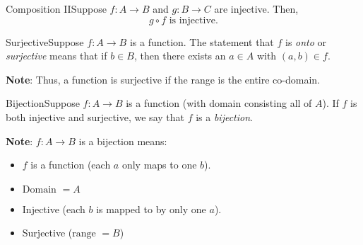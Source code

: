 
            \begin{exercise}
                {Composition II}Suppose \(f\colon A \rightarrow B\) and \(g\colon B\rightarrow C\) are injective. Then, \[g\circ f \text{ is injective.}\]
            \end{exercise}



            \begin{definition}
                {Surjective}Suppose \(f\colon A \rightarrow B\) is a function. The statement that \(f\) is \textit{onto} or \textit{surjective} means that if \(b\in B\), then there exists an \(a\in A\) with \((a,b)\in f\).
            \end{definition}
            \textbf{Note}: Thus, a function is surjective if the range is the entire co-domain.


            \begin{definition}
                {Bijection}Suppose \(f\colon A \rightarrow B\) is a function (with domain consisting all of \(A\)). If \(f\) is both injective and surjective, we say that \(f\) is a \textit{bijection}.
            \end{definition}
            \textbf{Note}: \(f\colon A\rightarrow B\) is a bijection means: 
            \begin{itemize}
                \item \(f\) is a function (each \(a\) only maps to one \(b\)).
                \item \(\text{Domain } = A\)
                \item Injective (each \(b\) is mapped to by only one \(a\)).
                \item Surjective (\(\text{range } = B\))
            \end{itemize}

